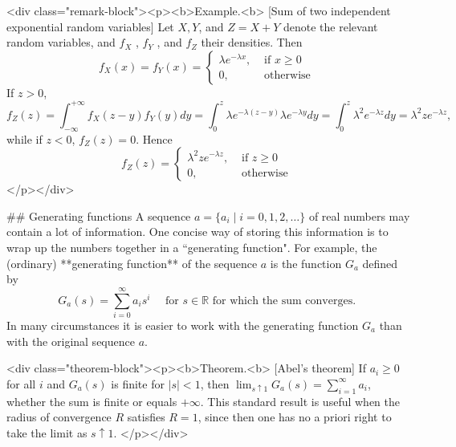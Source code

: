 <div class="remark-block"><p><b>Example.<b> [Sum of two independent exponential random variables]
Let $X, Y$, and $Z = X + Y$ denote the relevant random variables, and $f_X$ , $f_Y$ , and $f_Z$ their densities. Then
$$\begin{equation}
    f_{X}(x)=f_{Y}(x)=\left\{\begin{array}{ll}{\lambda e^{-\lambda x},} & {\text { if } x \geq 0} \\ {0,} & {\text { otherwise }}\end{array}\right.
\end{equation}$$
If $z > 0$,
$$\begin{equation}
    f_{Z}(z)=\int_{-\infty}^{+\infty} f_{X}(z-y) f_{Y}(y) d y =\int_{0}^{z} \lambda e^{-\lambda(z-y)} \lambda e^{-\lambda y} d y =\int_{0}^{z} \lambda^{2} e^{-\lambda z} d y =\lambda^{2} z e^{-\lambda z},
\end{equation}$$
while if $z < 0$, $f_Z(z) = 0$. Hence 
$$\begin{equation}
    f_{Z}(z)=\left\{\begin{array}{ll}{\lambda^{2} z e^{-\lambda z},} & {\text { if } z \geq 0} \\ {0,} & {\text { otherwise }}\end{array}\right.
\end{equation}$$
</p></div>


## Generating functions
A sequence $a = \{a_i \;\vert\; i = 0, 1 , 2, \dots \}$ of real numbers may contain a lot of information. One concise way of storing this information is to wrap up the numbers together in a ``generating function". For example, the (ordinary) **generating function** of the sequence $a$ is the function $G_a$ defined by 
$$\begin{equation}
    G_{a}(s)=\sum_{i=0}^{\infty} a_{i} s^{i} \quad \text { for } s \in \mathbb{R} \text { for which the sum converges. }
\end{equation}$$
In many circumstances it is easier to work with the generating function $G_a$ than with the original sequence $a$.

<div class="theorem-block"><p><b>Theorem.<b> [Abel's theorem]
If $a_i \geq 0$ for all $i$ and $G_a(s)$ is finite for $\left\vert s \right\vert < 1$, then $\lim_{s \uparrow 1} G_a (s) = \sum_{i=1}^ \infty a_i$, whether the sum is finite or equals $+\infty$. This standard result is useful when the radius of convergence $R$ satisfies $R = 1$, since then one has no a priori right to take the limit as $s \uparrow 1$.
</p></div>


